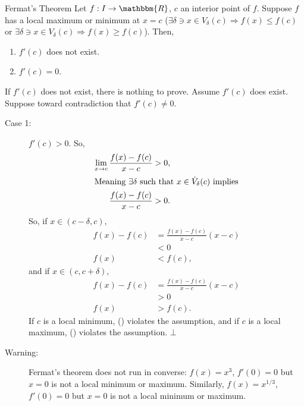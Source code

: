 \documentclass[10pt]{extarticle}
\newcommand{\R}{\mathbbm{R}}
\begin{document}
  \begin{problem}{Fermat's Theorem}
    Let $f: I\rightarrow \R$, $c$ an interior point of $f$. Suppose $f$ has a local maximum or minimum at $x=c$ ($\exists \delta \ni x\in V_{\delta}(c) \Rightarrow f(x) \leq f(c)$ or $\exists \delta \ni x\in V_{\delta}(c) \Rightarrow f(x) \geq f(c)$). Then,
    \begin{enumerate}[(1)]
      \item $f'(c)$ does not exist.
      \item $f'(c) = 0$.
    \end{enumerate}
    \tcblower
    If $f'(c)$ does not exist, there is nothing to prove. Assume $f'(c)$ does exist.\\

    Suppose toward contradiction that $f'(c) \neq 0$.
    \begin{description}
      \item[Case 1:] $f'(c) > 0$. So,
        \begin{align*}
          \lim_{x\rightarrow c}\frac{f(x)-f(c)}{x-c} &> 0,\\
          \shortintertext{Meaning $\exists \delta$ such that $x\in \dot{V}_{\delta}(c)$ implies}
          \frac{f(x)-f(c)}{x-c} &> 0.
        \end{align*}
        So, if $x\in (c-\delta,c)$,
        \begin{align*}
          f(x)-f(c) &= \frac{f(x)-f(c)}{x-c}(x-c)\\
                    &< 0\\
          f(x) &< f(c), \tag*{(\textasteriskcentered)}
        \end{align*}
        and if $x\in (c,c+\delta)$,
        \begin{align*}
          f(x)-f(c) &= \frac{f(x)-f(c)}{x-c}(x-c)\\
                    &> 0\\
          f(x) &> f(c).\tag*{(\textasteriskcentered\textasteriskcentered)}
        \end{align*}
        If $c$ is a local minimum, (\textasteriskcentered) violates the assumption, and if $c$ is a local maximum, (\textasteriskcentered\textasteriskcentered) violates the assumption. $\bot$
    \end{description}
    \begin{description}
      \item[Warning:] Fermat's theorem does not run in converse: $f(x) = x^3$, $f'(0) = 0$ but $x=0$ is not a local minimum or maximum. Similarly, $f(x) = x^{1/3}$, $f'(0)= 0$ but $x=0$ is not a local minimum or maximum.
    \end{description}
  \end{problem}
\end{document}
